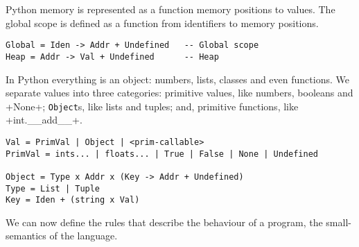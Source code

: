 Python memory is represented as a function memory positions to values. The global scope is
defined as a function from identifiers to memory positions.

\begin{verbatim}
Global = Iden -> Addr + Undefined   -- Global scope
Heap = Addr -> Val + Undefined      -- Heap
\end{verbatim}

In Python everything is an object: numbers, lists, classes and even functions. We separate
values into three categories: primitive values, like numbers, booleans and \pycode+None+;
\verb+Object+s, like lists and tuples; and, primitive functions, like
\pycode+int.__add__+.

\begin{verbatim}
Val = PrimVal | Object | <prim-callable>
PrimVal = ints... | floats... | True | False | None | Undefined

Object = Type x Addr x (Key -> Addr + Undefined)
Type = List | Tuple
Key = Iden + (string x Val)
\end{verbatim}

We can now define the rules that describe the behaviour of a program, the small-semantics
of the language.

